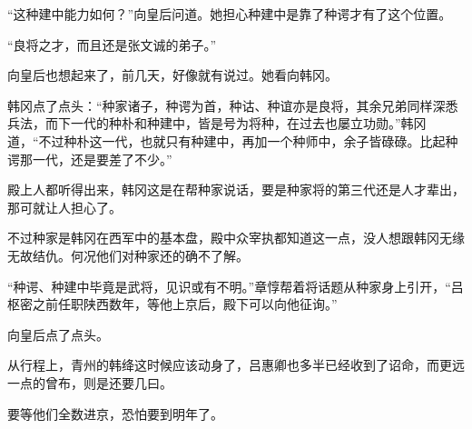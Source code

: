“这种建中能力如何？”向皇后问道。她担心种建中是靠了种谔才有了这个位置。

“良将之才，而且还是张文诚的弟子。”

向皇后也想起来了，前几天，好像就有说过。她看向韩冈。

韩冈点了点头：“种家诸子，种谔为首，种诂、种谊亦是良将，其余兄弟同样深悉兵法，而下一代的种朴和种建中，皆是号为将种，在过去也屡立功勋。”韩冈道，“不过种朴这一代，也就只有种建中，再加一个种师中，余子皆碌碌。比起种谔那一代，还是要差了不少。”

殿上人都听得出来，韩冈这是在帮种家说话，要是种家将的第三代还是人才辈出，那可就让人担心了。

不过种家是韩冈在西军中的基本盘，殿中众宰执都知道这一点，没人想跟韩冈无缘无故结仇。何况他们对种家还的确不了解。

“种谔、种建中毕竟是武将，见识或有不明。”章惇帮着将话题从种家身上引开，“吕枢密之前任职陕西数年，等他上京后，殿下可以向他征询。”

向皇后点了点头。

从行程上，青州的韩绛这时候应该动身了，吕惠卿也多半已经收到了诏命，而更远一点的曾布，则是还要几曰。

要等他们全数进京，恐怕要到明年了。

